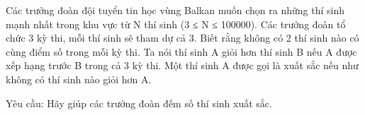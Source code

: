 Các trưởng đoàn đội tuyển tin học vùng Balkan muốn chọn ra những thí sinh mạnh nhất trong khu vực từ N thí sinh (3 ≤ N ≤ 100000). Các trưởng   đoàn tổ chức 3 kỳ thi, mỗi thí sinh sẽ tham dự cả 3. Biết rằng không có 2 thí sinh nào có cùng điểm số trong mỗi kỳ thi. Ta nói thí sinh A       giỏi   hơn      thí sinh B nếu A được xếp hạng trước B trong cả 3 kỳ thi. Một thí sinh A được gọi là       xuất sắc      nếu như không có thí sinh nào giỏi hơn   A.  

   Yêu cầu: Hãy giúp các trưởng đoàn đếm số thí sinh xuất sắc.